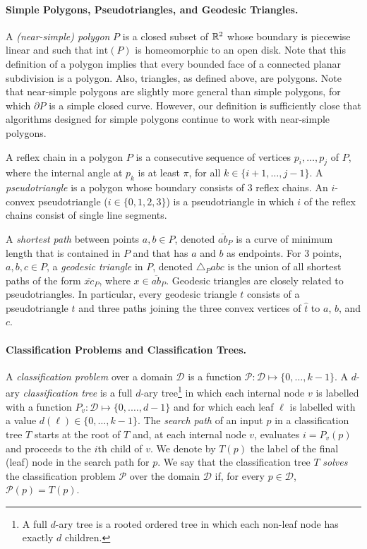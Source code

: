 \documentclass[lotsofwhite]{patmorin}
\newcommand{\boundary}{\partial}
\newcommand{\interior}{\mathrm{int}}
\newcommand{\z}[1]{{\hat{#1}}}
\begin{document}
\paragraph{Simple Polygons, Pseudotriangles, and Geodesic Triangles.}

A \emph{(near-simple) polygon} $P$ is a closed subset of $\mathbb{R}^2$ whose
boundary is piecewise linear and such that $\interior(P)$ is
homeomorphic to an open disk.  Note that this definition of a polygon
implies that every bounded face of a connected planar subdivision is a
polygon.  Also, triangles, as defined above, are polygons.  Note that
near-simple polygons are slightly more general than simple polygons,
for which $\boundary P$ is a simple closed curve.  However, our
definition is sufficiently close that algorithms designed for simple
polygons continue to work with near-simple polygons.

A reflex chain in a polygon $P$ is a consecutive sequence of vertices
$p_i,\ldots,p_j$ of $P$, where the internal angle at $p_k$ is at least
$\pi$, for all $k\in\{i+1,\ldots,j-1\}$. A \emph{pseudotriangle} is a
polygon whose boundary consists of 3 reflex chains.  An $i$-convex
pseudotriangle ($i\in\{0,1,2,3\}$) is a pseudotriangle in which $i$ of
the reflex chains consist of single line segments.

A \emph{shortest path} between points $a,b\in P$, denoted
$\overline{ab}_P$ is a curve of minimum length that is contained in
$P$ and that has $a$ and $b$ as endpoints.  For 3 points, $a,b,c\in
P$, a \emph{geodesic triangle} in $P$, denoted $\triangle_P abc$ is
the union of all shortest paths of the form $\overline{xc}_P$, where
$x\in\overline{ab}_P$.  Geodesic triangles are closely related to
pseudotriangles.  In particular, every geodesic triangle $t$ consists
of a pseudotriangle $\z t$ and three paths joining the three convex
vertices of $\z t$ to $a$, $b$, and $c$.

\paragraph{Classification Problems and Classification Trees.}

A \emph{classification problem} over a domain $\mathcal{D}$ is a
function $\mathcal{P}:\mathcal{D}\mapsto \{0,\ldots,k-1\}$.  A
$d$-ary \emph{classification tree} is a full $d$-ary tree\footnote{A
full $d$-ary tree is a rooted ordered tree in which each non-leaf node
has exactly $d$ children.} in which each internal node $v$ is labelled
with a function $P_v:\mathcal{D}\mapsto\{0,.\ldots,d-1\}$ and for
which each leaf $\ell$ is labelled with a value
$d(\ell)\in\{0,\ldots,k-1\}$. The \emph{search path} of an input $p$
in a classification tree $T$ starts at the root of $T$ and, at each
internal node $v$, evaluates $i=P_v(p)$ and proceeds to the $i$th
child of $v$.  We denote by $T(p)$ the label of the final (leaf) node
in the search path for $p$.  We say that the classification tree $T$
\emph{solves} the classification problem $\mathcal{P}$ over the domain
$\mathcal{D}$ if, for every $p\in \mathcal{D}$, $\mathcal{P}(p)=T(p)$.
\end{document}
